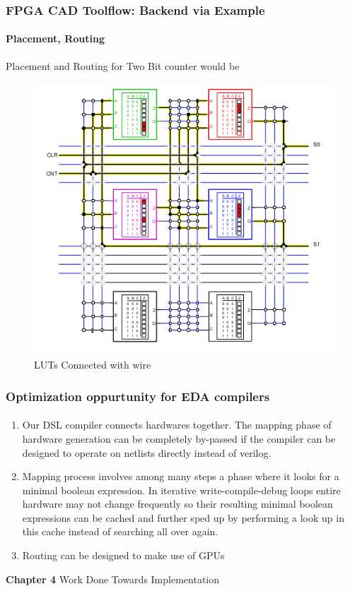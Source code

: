 \documentclass{beamer}
\begin{document}
\begin{frame}[fragile]
  \frametitle{FPGA CAD Toolflow: Backend via Example}
  \framesubtitle{Placement, Routing}

  Placement and Routing for Two Bit counter would be 

  \begin{figure}
    \centering
    \includegraphics[width=0.5\linewidth]{images/fpga_luts.png}
    \caption{LUTs Connected with wire}
    \label{exa_interconnect}
  \end{figure}
\end{frame}

\begin{frame}[fragile]
  \frametitle{Optimization oppurtunity for EDA compilers}
  \framesubtitle{}
  \begin{enumerate}
    \item Our DSL compiler connects hardwares together. The mapping phase
      of hardware generation can be completely by-passed if the compiler can
      be designed to operate on netlists directly instead of verilog.
    \item Mapping process involves among many steps a phase where it looks
      for a minimal boolean expression. In iterative write-compile-debug loops
      entire hardware may not change frequently so their resulting minimal
      boolean expressions can be cached and further sped up by performing a
      look up in this cache instead of searching all over again.
    \item Routing can be designed to make use of GPUs 
  \end{enumerate}
\end{frame}

\begin{frame}[c,fragile]

  \centering
  \textbf{Chapter 4}
  Work Done Towards Implementation
\end{frame}
\end{document}
